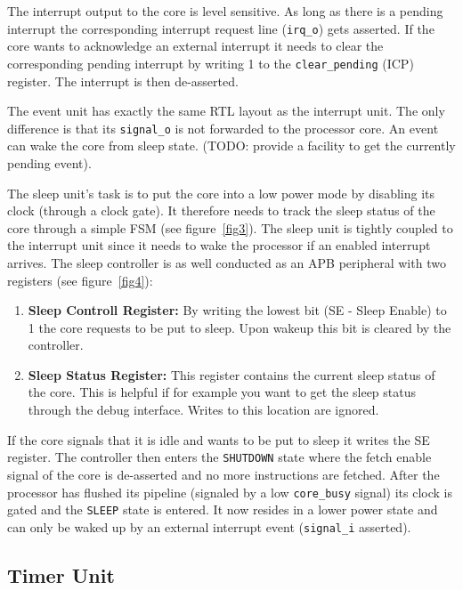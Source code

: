 The interrupt output to the core is level sensitive. As long as there is a pending interrupt the corresponding interrupt request line (\verb+irq_o+) gets asserted. If the core wants to acknowledge an external interrupt it needs to clear the corresponding pending interrupt by writing 1 to the \verb+clear_pending+ (ICP) register. The interrupt is then de-asserted.

The event unit has exactly the same RTL layout as the interrupt unit. The only difference is that its \verb+signal_o+ is not forwarded to the processor core. An event can wake the core from sleep state. (TODO: provide a facility to get the currently pending event).

The sleep unit's task is to put the core into a low power mode by disabling its clock (through a clock gate). It therefore needs to track the sleep status of the core through a simple FSM (see figure~\ref{fig3}). The sleep unit is tightly coupled to the interrupt unit since it needs to wake the processor if an enabled interrupt arrives.
The sleep controller is as well conducted as an APB peripheral with two registers (see figure~\ref{fig4}):

\begin{enumerate}
    \item \textbf{Sleep Controll Register:} By writing the lowest bit (SE - Sleep Enable) to 1 the core requests to be put to sleep. Upon wakeup this bit is cleared by the controller.
    \item \textbf{Sleep Status Register:} This register contains the current sleep status of the core. This is helpful if for example you want to get the sleep status through the debug interface. Writes to this location are ignored.
\end{enumerate}

If the core signals that it is idle and wants to be put to sleep it writes the SE register. The controller then enters the \verb+SHUTDOWN+ state where the fetch enable signal of the core is de-asserted and no more instructions are fetched. After the processor has flushed its pipeline (signaled by a low \verb+core_busy+ signal) its clock is gated and the \verb+SLEEP+ state is entered. It now resides in a lower power state and can only be waked up by an external interrupt event (\verb+signal_i+ asserted).

\subsection{Timer Unit}

